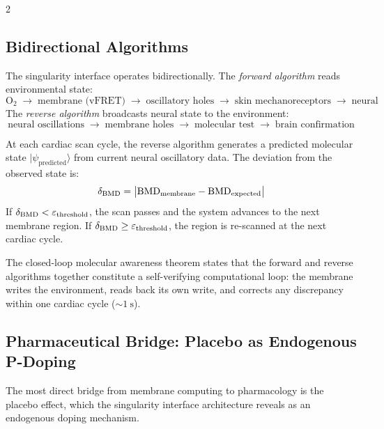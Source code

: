 \begin{multicols}{2}
\subsection{Bidirectional Algorithms}

The singularity interface operates bidirectionally. The \emph{forward algorithm} reads environmental state:
\begin{equation}
\text{O}_2 \;\to\; \text{membrane (vFRET)} \;\to\; \text{oscillatory holes} \;\to\; \text{skin mechanoreceptors} \;\to\; \text{neural}
\label{eq:ch11_forward}
\end{equation}
The \emph{reverse algorithm} broadcasts neural state to the environment:
\begin{equation}
\text{neural oscillations} \;\to\; \text{membrane holes} \;\to\; \text{molecular test} \;\to\; \text{brain confirmation}
\label{eq:ch11_reverse}
\end{equation}

\begin{definition}
\label{def:mol_turing}
At each cardiac scan cycle, the reverse algorithm generates a predicted molecular state $|\psi_{\mathrm{predicted}}\rangle$ from current neural oscillatory data. The deviation from the observed state is:
\begin{equation}
\delta_{\mathrm{BMD}} = \bigl|\mathrm{BMD}_{\mathrm{membrane}} - \mathrm{BMD}_{\mathrm{expected}}\bigr|
\label{eq:ch11_turing}
\end{equation}
If $\delta_{\mathrm{BMD}} < \varepsilon_{\mathrm{threshold}}$, the scan passes and the system advances to the next membrane region. If $\delta_{\mathrm{BMD}} \geq \varepsilon_{\mathrm{threshold}}$, the region is re-scanned at the next cardiac cycle.
\end{definition}

The closed-loop molecular awareness theorem states that the forward and reverse algorithms together constitute a self-verifying computational loop: the membrane writes the environment, reads back its own write, and corrects any discrepancy within one cardiac cycle ($\sim 1\ \mathrm{s}$).

\subsection{Pharmaceutical Bridge: Placebo as Endogenous P-Doping}

The most direct bridge from membrane computing to pharmacology is the placebo effect, which the singularity interface architecture reveals as an endogenous doping mechanism.


\end{multicols}
